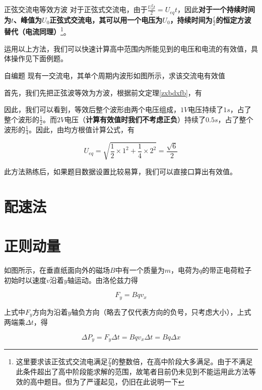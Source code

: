 \begin{theo}[label=zxbdxfb]{正弦交流电等效方波}{}
对于正弦式交流电，由于$\frac{U_0^2 t}{2} = U_{eq} t$，因此\textbf{对于一个持续时间为$t$、峰值为$U_0$正弦式交流电，其可以用一个电压为$U_0$，持续时间为$\frac{t}{2}$的恒定方波替代（电流同理）}\footnote{这里要求该正弦式交流电满足$\frac{T}{4}$的整数倍，在高中阶段大多满足。由于不满足此条件超出了高中阶段能求解的范围，故笔者目前仍未见到不能运用此方法等效的高中题目。但为了严谨起见，仍旧在此说明一下}。
\end{theo}



运用以上方法，我们可以快速计算高中范围内所能见到的电压和电流的有效值，具体操作见下面例题。

\begin{ep}{自编题}{}
现有一交流电，其单个周期内波形如图所示，求该交流电有效值



首先，我们先把正弦波等效为方波，根据前文定理\eqref{zxbdxfb}，有



因此，我们可以看到，等效后整个波形由两个电压组成，$1V$电压持续了$1s$，占了整个波形的$\frac{1}{2}$。而$2V$电压（\textbf{计算有效值时我们不考虑正负}）持续了$0.5s$，占了整个波形的$\frac{1}{4}$。因此，由均方根值计算公式，有

$$U_{eq} = \sqrt{\frac{1}{2} \times 1^2 + \frac{1}{4} \times 2^2} = \frac{\sqrt{6}}{2}$$

此方法熟练后，如果题目数据设置比较易算，我们可以直接口算出有效值。

\end{ep}

\section{配速法}

\section{正则动量}

如图所示，在垂直纸面向外的磁场$B$中有一个质量为$m$，电荷为$q$的带正电荷粒子初始时以速度$v$沿着$y$轴运动。由洛伦兹力得

$$F_y = B q v_x$$

上式中$F_y$方向为沿着$y$轴负方向（略去了仅代表方向的负号，只考虑大小），上式两端乘$\Delta t$，得

$$\Delta P_y = F_y \Delta t = B q v_x \Delta t = B q \Delta x$$

